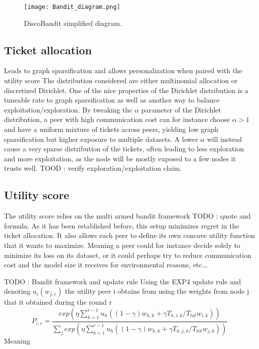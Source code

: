 \documentclass{article}
\begin{document}
    \begin{figure}[h]
      \centering
      \texttt{[image: Bandit\_diagram.png]}
      \caption{DiscoBandit simplified diagram.}
      \label{fig:modelarch}
    \end{figure}

    \subsection{Ticket allocation}
    Leads to graph sparsification and allows personalization when paired with the utility score
    The distribution considered are either multinomial allocation or discretized Dirichlet. One of the nice properties of the Dirichlet distribution is a tuneable rate to graph sparsification as well as another way to balance exploitation/exploration. By tweaking the $\alpha$ parameter of the Dirichlet distribution, a peer with high communication cost can for instance choose $\alpha>1$ and have a uniform mixture of tickets across peers, yielding low graph sparsification but higher exposure to multiple datasets. A lower $\alpha$ will instead cause a very sparse distribution of the tickets, often leading to less exploration and more exploitation, as the node will be mostly exposed to a few nodes it trusts well. TOOD : verify exploration/exploitation claim.
    
    
    \subsection{Utility score}
    The utility score relies on the multi armed bandit framework TODO : quote and formula.
    As it has been established before, this setup minimizes regret in the ticket allocation.
    It also allows each peer to define its own concave utility function that it wants to maximize. Meaning a peer could for instance decide solely to minimize its loss on its dataset, or it could perhaps try to reduce communication cost and the model size it receives for environmental reasons, etc...

    TODO : Bandit framework and update rule
    Using the EXP4 update rule and denoting $u_i(w_{j,r})$ the utility peer i obtains from using the weights from node j that it obtained during the round r
    $$P_{i,r}=\frac{exp({\eta \sum_{k=1}^{r-1} u_h((1-\gamma)w_{h, k}+\gamma T_{h,i,k}/T_{tot}w_{i, k})})}{\sum_{j}exp({\eta \sum_{k=1}^{r-1} u_h((1-\gamma)w_{h, k}+\gamma T_{h,j,k}/T_{tot}w_{j, k})})}$$
    Meaning 
\end{document}
